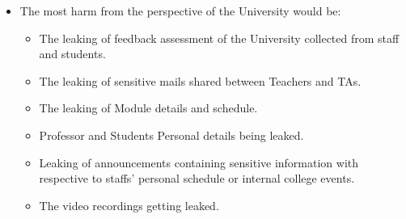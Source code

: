 \documentclass[10pt,a4paper,oneside]{article}
\begin{document}
\begin{itemize}
\item The most harm from the perspective of the University would be:
\begin{itemize}
\item The leaking of feedback assessment of the University collected from staff and students.
\item The leaking of sensitive mails shared between Teachers and TAs.
\item The leaking of Module details and schedule.
\item Professor and Students Personal details being leaked.
\item Leaking of announcements containing sensitive information with respective to staffs' personal schedule or internal college events.
\item The video recordings getting leaked.
\end{itemize}

\end{itemize}
\end{document}
